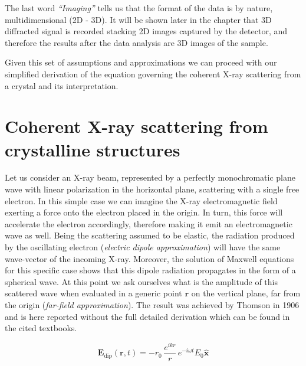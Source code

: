 The last word \textit{``Imaging''} tells us that the format of the data is by nature, multidimensional (2D - 3D). It 
will be shown later in the chapter that 3D diffracted signal is recorded stacking 2D images captured by the detector, 
and therefore the results after the data analysis are 3D images of the sample.

Given this set of assumptions and approximations we can proceed with our simplified derivation of the equation governing 
the coherent X-ray scattering from a crystal and its interpretation. 

\section{Coherent X-ray scattering from crystalline structures}

Let us consider an X-ray beam, represented by a perfectly monochromatic plane wave with linear polarization in the horizontal 
plane, scattering with a single free electron. In this simple case we can imagine the X-ray electromagnetic field exerting 
a force onto the electron placed in the origin. In turn, this force will accelerate the electron accordingly, therefore making it emit an 
electromagnetic wave as well. Being the scattering assumed to be elastic, the radiation produced by the oscillating 
electron (\textit{electric dipole approximation}) will have the same wave-vector of the incoming X-ray. Moreover, the 
solution of Maxwell equations for this specific case 
shows that this dipole radiation propagates in the form of a spherical wave. At this point we ask ourselves what is the amplitude 
of this scattered wave when evaluated in a generic point $\mathbf r$ on the vertical plane, far from the origin (\textit{far-field approximation}). 
The result was achieved by Thomson in 1906 and is here reported without the full detailed derivation which can be found in the 
cited textbooks. 


\begin{equation}
    \mathbf{E}_{\text{dip}}(\mathbf{r},t) 
    = -r_0 \, \frac{e^{ikr}}{r} \, e^{-i \omega t} 
    E_0 \mathbf{\hat{x}}
    \label{eq:scattering_pointlike}
\end{equation}

